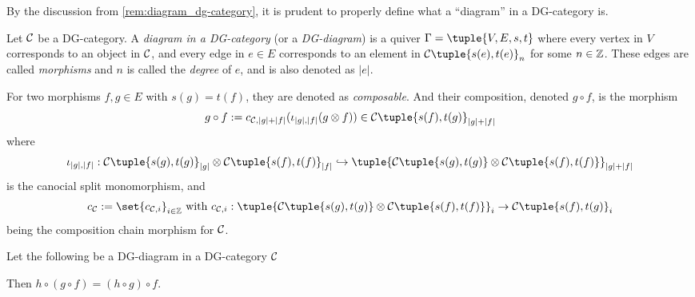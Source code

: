 \begin{notation}
    By the discussion from \autoref{rem:diagram_dg-category}, it is prudent to properly define what a ``diagram'' in a DG-category is.

    Let \( {\mathcal{C}} \) be a DG-category. A \emph{diagram in a DG-category} (or a \emph{DG-diagram}) is a quiver \( \Gamma = \tuple{V, E, s, t} \) where every vertex in \( V \) corresponds to an object in \( {\mathcal{C}} \), and every edge in \( e \in E \) corresponds to an element in \( \Cc\tuple{s(e), t(e)}_n \) for some \( n \in {\mathbb{Z}} \). These edges are called \emph{morphisms} and \( n \) is called the \emph{degree} of \( e \), and is also denoted as \( |e| \).

    For two morphisms \( f, g \in E \) with \( s(g) = t(f) \), they are denoted as \emph{composable}. And their composition, denoted \( g \circ f \), is the morphism
    \[
        g \circ f := c_{\Cc, |g| + |f|}(\iota_{|g|, |f|}(g \otimes f)) \in \Cc\tuple{s(f), t(g)}_{|g| + |f|}
    \]
    where
    \[
        \iota_{|g|, |f|}: \Cc\tuple{s(g), t(g)}_{|g|} \otimes \Cc\tuple{s(f), t(f)}_{|f|} \hookrightarrow \tuple{ \Cc\tuple{s(g), t(g)} \otimes \Cc\tuple{s(f), t(f)} }_{|g| + |f|}
    \]
    is the canocial split monomorphism, and
    \[
        c_{\Cc} := \set{c_{\Cc, i}}_{i \in \Zb} \text{ with } c_{\Cc, i}: \tuple{ \Cc\tuple{s(g), t(g)} \otimes \Cc\tuple{s(f), t(f)} }_i \to \Cc\tuple{s(f), t(g)}_i
    \]
    being the composition chain morphism for \( {\mathcal{C}} \).
\end{notation}
\begin{lemma}
    \label{lem:dg-composition_associative}
    Let the following be a DG-diagram in a DG-category \( {\mathcal{C}} \)
    \begin{center}
    \end{center}

    Then \( h \circ (g \circ f) = (h \circ g) \circ f \).
\end{lemma}
